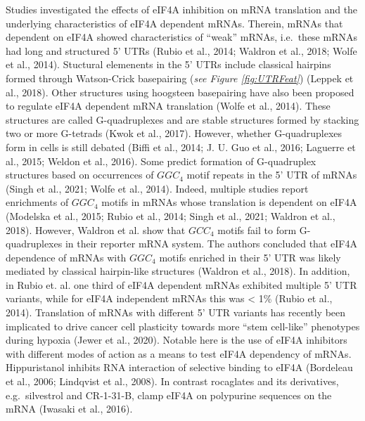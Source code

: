 \documentclass[12pt,openany]{book}
\begin{document}
Studies investigated the effects of eIF4A inhibition on mRNA translation
and the underlying characteristics of eIF4A dependent mRNAs. Therein,
mRNAs that dependent on eIF4A showed characteristics of ``weak'' mRNAs,
i.e.~these mRNAs had long and structured 5' UTRs (Rubio et al., 2014;
Waldron et al., 2018; Wolfe et al., 2014). Stuctural elemenents in the
5' UTRs include classical hairpins formed through Watson-Crick
basepairing (\emph{see Figure \ref{fig:UTRFeat}}) (Leppek et al., 2018).
Other structures using hoogsteen basepairing have also been proposed to
regulate eIF4A dependent mRNA translation (Wolfe et al., 2014). These
structures are called G-quadruplexes and are stable structures formed by
stacking two or more G-tetrads (Kwok et al., 2017). However, whether
G-quadruplexes form in cells is still debated (Biffi et al., 2014; J. U.
Guo et al., 2016; Laguerre et al., 2015; Weldon et al., 2016). Some
predict formation of G-quadruplex structures based on occurrences of
\(GGC_4\) motif repeats in the 5' UTR of mRNAs (Singh et al., 2021;
Wolfe et al., 2014). Indeed, multiple studies report enrichments of
\(GGC_4\) motifs in mRNAs whose translation is dependent on eIF4A
(Modelska et al., 2015; Rubio et al., 2014; Singh et al., 2021; Waldron
et al., 2018). However, Waldron et al. show that \(GCC_4\) motifs fail
to form G-quadruplexes in their reporter mRNA system. The authors
concluded that eIF4A dependence of mRNAs with \(GGC_4\) motifs enriched
in their 5' UTR was likely mediated by classical hairpin-like structures
(Waldron et al., 2018). In addition, in Rubio et. al. one third of eIF4A
dependent mRNAs exhibited multiple 5' UTR variants, while for eIF4A
independent mRNAs this was \textless{} 1\% (Rubio et al., 2014).
Translation of mRNAs with different 5' UTR variants has recently been
implicated to drive cancer cell plasticity towards more ``stem
cell-like'' phenotypes during hypoxia (Jewer et al., 2020). Notable here
is the use of eIF4A inhibitors with different modes of action as a means
to test eIF4A dependency of mRNAs. Hippuristanol inhibits RNA
interaction of selective binding to eIF4A (Bordeleau et al., 2006;
Lindqvist et al., 2008). In contrast rocaglates and its derivatives,
e.g.~silvestrol and CR-1-31-B, clamp eIF4A on polypurine sequences on
the mRNA (Iwasaki et al., 2016).
\end{document}
